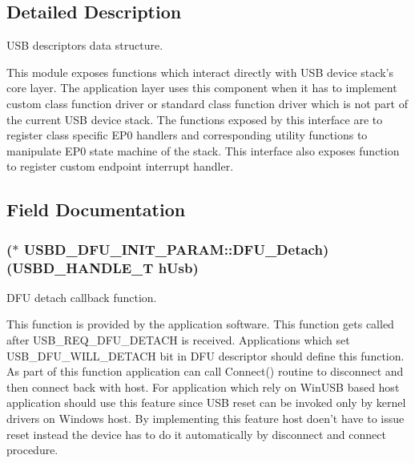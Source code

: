 \subsection{Detailed Description}
U\-S\-B descriptors data structure. 

This module exposes functions which interact directly with U\-S\-B device stack's core layer. The application layer uses this component when it has to implement custom class function driver or standard class function driver which is not part of the current U\-S\-B device stack. The functions exposed by this interface are to register class specific E\-P0 handlers and corresponding utility functions to manipulate E\-P0 state machine of the stack. This interface also exposes function to register custom endpoint interrupt handler. 

\subsection{Field Documentation}
\hypertarget{structUSBD__DFU__INIT__PARAM_aa0bbec57d9bc881b52d406a2911c1ca2}{
\subsubsection[{D\-F\-U\-\_\-\-Detach}]{($\ast$ U\-S\-B\-D\-\_\-\-D\-F\-U\-\_\-\-I\-N\-I\-T\-\_\-\-P\-A\-R\-A\-M\-::\-D\-F\-U\-\_\-\-Detach)({\bf U\-S\-B\-D\-\_\-\-H\-A\-N\-D\-L\-E\-\_\-\-T} h\-Usb)}}\label{structUSBD__DFU__INIT__PARAM_aa0bbec57d9bc881b52d406a2911c1ca2}
D\-F\-U detach callback function.

This function is provided by the application software. This function gets called after U\-S\-B\-\_\-\-R\-E\-Q\-\_\-\-D\-F\-U\-\_\-\-D\-E\-T\-A\-C\-H is received. Applications which set U\-S\-B\-\_\-\-D\-F\-U\-\_\-\-W\-I\-L\-L\-\_\-\-D\-E\-T\-A\-C\-H bit in D\-F\-U descriptor should define this function. As part of this function application can call Connect() routine to disconnect and then connect back with host. For application which rely on Win\-U\-S\-B based host application should use this feature since U\-S\-B reset can be invoked only by kernel drivers on Windows host. By implementing this feature host doen't have to issue reset instead the device has to do it automatically by disconnect and connect procedure.


